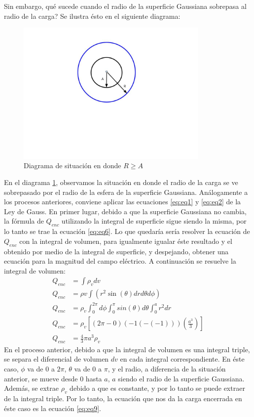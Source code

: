 \documentclass[12pt, letterpaper]{report}
\begin{document}
Sin embargo, qué sucede cuando el radio de la superficie Gaussiana sobrepasa al radio de la carga? Se ilustra ésto en el siguiente diagrama: 
\begin{figure}[H]
    \centering
    \includegraphics[height = 7cm]{2024-04-18_Diagrama2_ActividadCargas.jpeg}
    \caption{Diagrama de situación en donde $R \geq A$}
    \label{fig:fig2}
\end{figure}
En el diagrama \ref{fig:fig2}, observamos la situación en donde el radio de la carga se ve sobrepasado por el radio de la esfera de la superficie Gaussiana. Análogamente a los procesos anteriores, conviene aplicar las ecuaciones 
\ref{eq:eq1} y \ref{eq:eq2} de la Ley de Gauss. En primer lugar, debido a que la superficie Gaussiana no cambia, la fórmula de $Q_{enc}$ utilizando la integral de superficie sigue siendo la misma, por lo tanto se trae la ecuación \ref{eq:eq6}. Lo que 
quedaría sería resolver la ecuación de $Q_{enc}$ con la integral de volumen, para igualmente igualar éste resultado y el obtenido por medio de la integral de superficie, y despejando,  
obtener una ecuación para la magnitud del campo eléctrico. A continuación se resuelve la integral de volumen: 
\begin{align}
Q_{enc} &= \int \rho_v dv\\ 
Q_{enc} &= \rho v \int (r^2 \sin(\theta) dr d\theta d\phi)\\
Q_{enc} &= \rho_v \int_{0}^{2\pi} d\phi \int_{0}^{\pi}sin(\theta)d\theta \int_{0}^{a} r^2 dr \\
Q_{enc} &= \rho_v [(2\pi - 0)(-1(-(-1)))(\frac{a^3}{3})]\\
Q_{enc} &= \frac{4}{3}\pi a^3 \rho_v \label{eq:eq9}
\end{align}
En el proceso anterior, debido a que la integral de volumen es una integral triple, se separa el diferencial de volumen $dv$ en cada integral correspondiente. En éste caso, $\phi$ va de $0$ a 
$2\pi$, $\theta$ va de 0 a $\pi$, y el radio, a diferencia de la situación anterior, se mueve desde $0$ hasta $a$, $a$ siendo el radio de la superficie Gaussiana. Además, se extrae 
$\rho_v$ debido a que es constante, y por lo tanto se puede extraer de la integral triple. Por lo tanto, la ecuación que nos da la carga encerrada en éste caso es la ecuación 
\ref{eq:eq9}. \\
\end{document}

